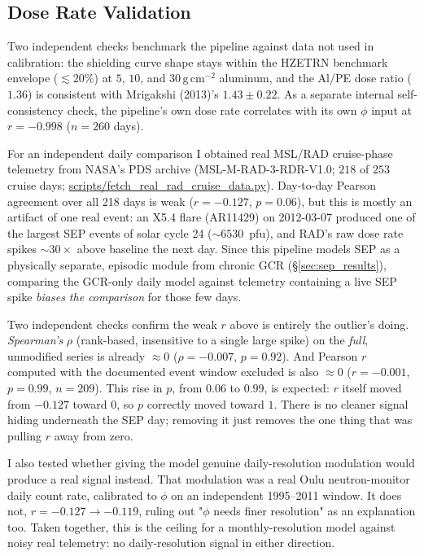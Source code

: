 \documentclass[a4paper,fleqn]{cas-dc}
\newcommand{\gcm}{\,\mathrm{g\,cm^{-2}}}
\begin{document}
\subsection{Dose Rate Validation}
\label{sec:validation}

Two independent checks benchmark the pipeline against data not used in
calibration: the shielding curve shape stays within the HZETRN benchmark
envelope ($\lesssim20\%$) \citep{slaba2014} at $5$, $10$, and $30\gcm$
aluminum, and the Al/PE dose ratio ($1.36$) is consistent with Mrigakshi
(2013)'s $1.43\pm0.22$. As a separate internal self-consistency check,
the pipeline's own dose rate correlates with
its own $\phi$ input at $r=-0.998$ ($n=260$ days).

For an independent daily comparison I obtained real MSL/RAD cruise-phase
telemetry from NASA's PDS archive (MSL-M-RAD-3-RDR-V1.0; $218$ of $253$
cruise days; \url{scripts/fetch_real_rad_cruise_data.py}). Day-to-day
Pearson agreement over all 218 days is weak ($r=-0.127$, $p=0.06$), but this
is mostly an artifact of one real event: an X5.4 flare (AR11429) on
2012-03-07 produced one of the largest SEP events of solar cycle 24
($\sim\!6530$~pfu), and RAD's raw dose rate spikes $\sim\!30\times$ above
baseline the next day. Since this pipeline models SEP as a physically
separate, episodic module from chronic GCR (\S\ref{sec:sep_results}),
comparing the GCR-only daily model against telemetry containing a live SEP
spike \emph{biases the comparison} for those few days.

Two independent checks confirm the weak $r$ above is entirely the
outlier's doing. \emph{Spearman's} $\rho$ (rank-based,
insensitive to a single large spike) on the \emph{full}, unmodified series
is already $\approx0$ ($\rho=-0.007$, $p=0.92$). And Pearson $r$ computed
with the documented event window excluded is also $\approx0$
($r=-0.001$, $p=0.99$, $n=209$). This rise in $p$, from $0.06$ to $0.99$, is
expected: $r$ itself moved from $-0.127$ toward $0$, so $p$ correctly moved
toward $1$. There is no cleaner signal hiding underneath the SEP day;
removing it just removes the one thing that was pulling $r$ away from zero.

I also tested whether
giving the model genuine daily-resolution modulation would produce a real
signal instead. That modulation was a real Oulu
neutron-monitor daily count rate, calibrated to $\phi$ on an independent
1995--2011 window. It does not,
$r=-0.127\to-0.119$, ruling out "$\phi$ needs finer resolution" as an
explanation too. Taken together, this is the ceiling for a
monthly-resolution model against noisy real telemetry: no daily-resolution
signal in either direction.
\end{document}
